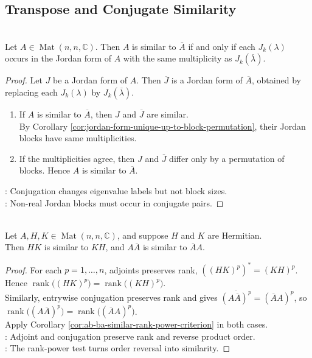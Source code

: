 \subsection{Transpose and Conjugate Similarity}

\begin{theorem} \label{thm:conjugate-similarity-jordan-block-criterion} \\
Let $A\in\operatorname{Mat}(n,n,\mathbb{C})$. Then $A$ is similar to $\overline{A}$ if and only if each $J_k(\lambda)$ occurs in the Jordan form of $A$ with the same multiplicity as $J_k(\overline{\lambda})$.
\begin{proof}
Let $J$ be a Jordan form of $A$. Then $\overline{J}$ is a Jordan form of $\overline{A}$, obtained by replacing each $J_k(\lambda)$ by $J_k(\overline{\lambda})$.
\begin{enumerate}[label=\roman*.]
\setlength{\itemsep}{0pt}
\item[$(\Rightarrow)$] If $A$ is similar to $\overline{A}$, then $J$ and $\overline{J}$ are similar.\\
By Corollary \ref{cor:jordan-form-unique-up-to-block-permutation}, their Jordan blocks have same multiplicities.
\item[$(\Leftarrow)$] If the multiplicities agree, then $J$ and $\overline{J}$ differ only by a permutation of blocks. Hence $A$ is similar to $\overline{A}$.
\end{enumerate}
: Conjugation changes eigenvalue labels but not block sizes.\\
: Non-real Jordan blocks must occur in conjugate pairs.
\end{proof}
\end{theorem}

\begin{corollary} \label{cor:hermitian-products-and-conjugate-products} \\
Let $A,H,K\in\operatorname{Mat}(n,n,\mathbb{C})$, and suppose $H$ and $K$ are Hermitian.\\
Then $HK$ is similar to $KH$, and $A\overline{A}$ is similar to $\overline{A}A$.
\begin{proof}
For each $p=1,\ldots,n$, adjoints preserves rank, $((HK)^p)^*=(KH)^p$. Hence $\operatorname{rank}\bigl((HK)^p\bigr)=\operatorname{rank}\bigl((KH)^p\bigr)$.\\
Similarly, entrywise conjugation preserves rank and gives $\overline{(A\overline{A})^p}=(\overline{A}A)^p$, so $\operatorname{rank}\bigl((A\overline{A})^p\bigr)=\operatorname{rank}\bigl((\overline{A}A)^p\bigr)$.\\
Apply Corollary \ref{cor:ab-ba-similar-rank-power-criterion} in both cases.\\
: Adjoint and conjugation preserve rank and reverse product order.\\
: The rank-power test turns order reversal into similarity.
\end{proof}
\end{corollary}

